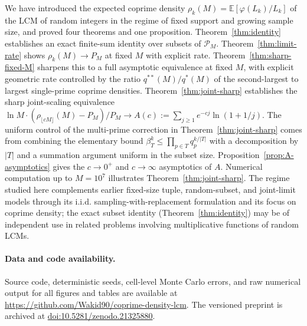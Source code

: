 \documentclass[11pt]{article}
\theoremstyle{remark}
\newcommand{\EE}{\mathbb{E}}
\newcommand{\PM}{\mathcal{P}_M}
\begin{document}
We have introduced the expected coprime density $\rho_k(M) = \EE[\varphi(L_k)/L_k]$ of the LCM of random integers in the regime of fixed support and growing sample size, and proved four theorems and one proposition. Theorem~\ref{thm:identity} establishes an exact finite-sum identity over subsets of $\PM$. Theorem~\ref{thm:limit-rate} shows $\rho_k(M) \to P_M$ at fixed $M$ with explicit rate. Theorem~\ref{thm:sharp-fixed-M} sharpens this to a full asymptotic equivalence at fixed $M$, with explicit geometric rate controlled by the ratio $q^{**}(M)/q^*(M)$ of the second-largest to largest single-prime coprime densities. Theorem~\ref{thm:joint-sharp} establishes the sharp joint-scaling equivalence $\ln M \cdot (\rho_{\lfloor cM \rfloor}(M) - P_M)/P_M \to A(c) := \sum_{j \geq 1} e^{-cj} \ln(1 + 1/j)$. The uniform control of the multi-prime correction in Theorem~\ref{thm:joint-sharp} comes from combining the elementary bound $\beta_T^k \leq \prod_{p \in T} q_p^{k/|T|}$ with a decomposition by $|T|$ and a summation argument uniform in the subset size. Proposition~\ref{prop:A-asymptotics} gives the $c \to 0^+$ and $c \to \infty$ asymptotics of $A$. Numerical computation up to $M = 10^7$ illustrates Theorem~\ref{thm:joint-sharp}. The regime studied here complements earlier fixed-size tuple, random-subset, and joint-limit models through its i.i.d. sampling-with-replacement formulation and its focus on coprime density; the exact subset identity (Theorem~\ref{thm:identity}) may be of independent use in related problems involving multiplicative functions of random LCMs.

\paragraph{Data and code availability.}
Source code, deterministic seeds, cell-level Monte Carlo errors, and raw numerical output for all figures and tables are available at \url{https://github.com/Wakid90/coprime-density-lcm}. The versioned preprint is archived at \href{https://doi.org/10.5281/zenodo.21325880}{doi:10.5281/zenodo.21325880}.
\end{document}
